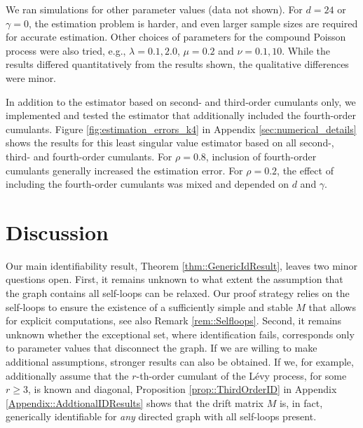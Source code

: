 \documentclass{biometrika}
\begin{document}
We ran simulations for other parameter values (data not shown). For $d = 24$ or
$\gamma = 0$, the estimation problem is harder, and even larger sample sizes are 
required for accurate estimation. Other choices of parameters for the compound 
Poisson process were also tried, e.g., $\lambda = 0.1, 2.0$, $\mu = 0.2$ and 
$\nu = 0.1, 10$. While the results  differed quantitatively from the results 
shown, the qualitative differences were minor. 

In addition to the estimator based on second- and third-order cumulants only, 
we implemented and tested the estimator that additionally included the fourth-order 
cumulants. 
Figure \ref{fig:estimation_errors_k4} in Appendix \ref{sec:numerical_details} 
shows the results for this least singular value estimator based on all second-, third-  
and fourth-order cumulants. For $\rho = 0.8$, inclusion of 
fourth-order cumulants generally increased the estimation error. For $\rho = 0.2$, 
the effect of including the fourth-order cumulants was mixed and depended on $d$ and $\gamma$. 

\section{Discussion} \label{sec::discussion} 

Our main identifiability result, Theorem \ref{thm::GenericIdResult}, leaves two minor questions 
open. First, it remains unknown to what extent the assumption that the graph 
contains all self-loops can be relaxed. Our proof strategy relies on the self-loops
to ensure the existence of a sufficiently simple and stable $M$ that allows for 
explicit computations, see also Remark \ref{rem::Selfloops}. Second, it remains unknown whether the exceptional set, where 
identification fails, corresponds only to parameter values that disconnect the graph. 
If we are willing to make additional assumptions, stronger results can also be obtained. 
If we, for example, additionally assume that the $r$-th-order cumulant 
of the Lévy process, for some $r \geq 3$, is known and diagonal, Proposition \ref{prop::ThirdOrderID} 
in Appendix \ref{Appendix::AddtionalIDResults} shows that the drift matrix $M$ is, 
in fact, generically identifiable for \emph{any} directed graph with all self-loops present.
\end{document}
